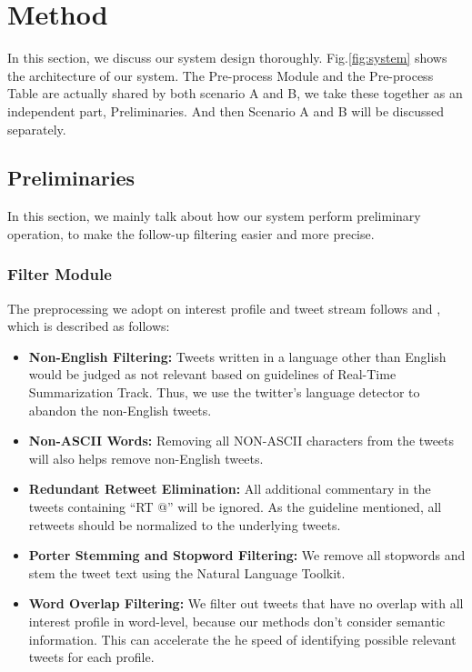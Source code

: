 \section{Method}

In this section, we discuss our system design thoroughly. Fig.\ref{fig:system} shows the architecture of our system. The Pre-process Module and the Pre-process Table are actually shared by both scenario A and B, we take these together as an independent part, Preliminaries. And then Scenario A and B will be discussed separately.  

\begin{figure*}[htbp]
\caption{The System Architecture.}
\label{fig:system}
\end{figure*}

\subsection{Preliminaries}
In this section, we mainly talk about how our system perform preliminary operation,
to make the follow-up filtering easier and more precise.

\subsubsection{Filter Module}
The preprocessing we adopt on interest profile and tweet stream follows \cite{yao2016pkuicst} and \cite{lvpkuicst},
which is described as follows:

\begin{itemize}
\item \textbf{Non-English Filtering:}
Tweets written in a language other than English would be judged as not relevant
based on guidelines of Real-Time Summarization Track.
Thus, we use the twitter's language detector to abandon the non-English tweets.
\item \textbf{Non-ASCII Words:}
Removing all NON-ASCII characters from the tweets will also helps remove non-English tweets.
\item \textbf{Redundant Retweet Elimination:}
All additional commentary in the tweets containing ``RT @'' will be ignored.
As the guideline mentioned, all retweets should be normalized to the underlying tweets.
\item \textbf{Porter Stemming and Stopword Filtering:}
We remove all stopwords and stem the tweet text using the Natural Language Toolkit.
\item \textbf{Word Overlap Filtering:}
We filter out tweets that have no overlap with all interest profile in word-level,
because our methods don't consider semantic information. 
This can accelerate the he speed of identifying possible relevant tweets for each profile.
\end{itemize}

